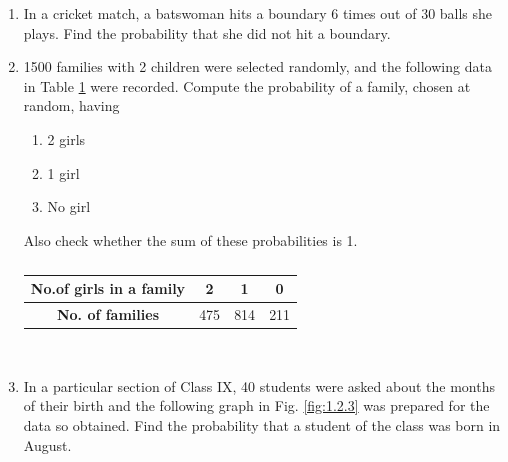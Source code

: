 \renewcommand{\theequation}{\theenumi}
\begin{enumerate}[label=\arabic*.,ref=\thesubsection.\theenumi]
	\item In a cricket match, a batswoman hits a boundary 6 times out of 30 balls she plays. Find the probability that she did not hit a boundary.
\\
\solution

    \item 1500 families with 2 children were selected randomly, and the following data in Table \ref{table:1.2.2} were recorded.
Compute the probability of a family, chosen at random, having
\begin{enumerate}
\item 2 girls
\item  1 girl
\item  No girl
\end{enumerate}
Also check whether the sum of these probabilities is 1.
\begin{table}[!ht]
\centering
\begin{tabular}{ |c|c|c|c| } 
 \hline
 \textbf{No.of girls in a family} &2 &1 &0\\ 
 \hline
 \textbf{No. of families}  &475 &814 &211\\ 
 \hline 
\end{tabular}
\caption{}
\label{table:1.2.2}
\end{table}
\\
\solution


\item In a particular section of Class IX, 40 students were asked about the months of their birth and the following graph in Fig. \ref{fig:1.2.3}
was prepared for the data so obtained.     Find the probability that a student of the class was born in August.

    
\solution



\end{enumerate}
